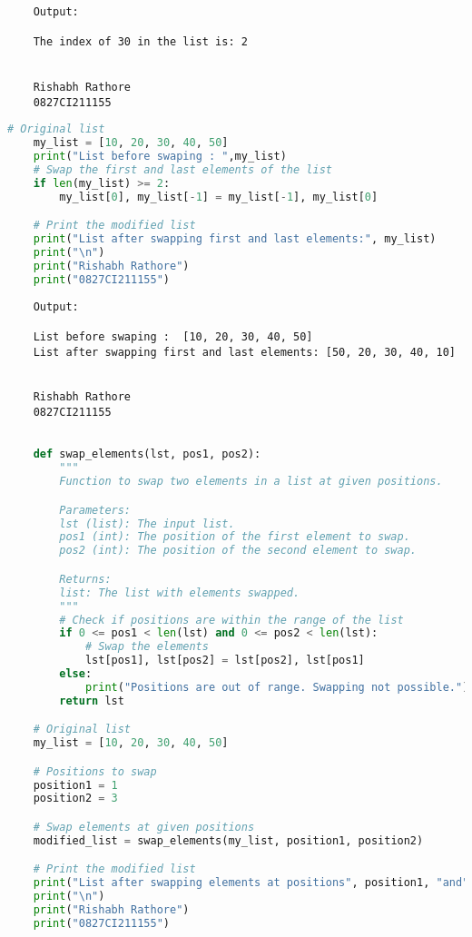 \documentclass{report}
\begin{document}
\begin{verbatim}

	Output:

	The index of 30 in the list is: 2


	Rishabh Rathore
	0827CI211155
\end{verbatim}
\bigskip


\sol{}
\begin{lstlisting}[language=Python]
	# Original list
	my_list = [10, 20, 30, 40, 50]
	print("List before swaping : ",my_list)
	# Swap the first and last elements of the list
	if len(my_list) >= 2:
		my_list[0], my_list[-1] = my_list[-1], my_list[0]

	# Print the modified list
	print("List after swapping first and last elements:", my_list)
	print("\n")
	print("Rishabh Rathore")
	print("0827CI211155")
\end{lstlisting}

\begin{verbatim}
	Output:

	List before swaping :  [10, 20, 30, 40, 50]
	List after swapping first and last elements: [50, 20, 30, 40, 10]
	
	
	Rishabh Rathore
	0827CI211155
\end{verbatim}
\bigskip


\sol{}
\begin{lstlisting}[language=Python]

	def swap_elements(lst, pos1, pos2):
		"""
		Function to swap two elements in a list at given positions.

		Parameters:
		lst (list): The input list.
		pos1 (int): The position of the first element to swap.
		pos2 (int): The position of the second element to swap.

		Returns:
		list: The list with elements swapped.
		"""
		# Check if positions are within the range of the list
		if 0 <= pos1 < len(lst) and 0 <= pos2 < len(lst):
			# Swap the elements
			lst[pos1], lst[pos2] = lst[pos2], lst[pos1]
		else:
			print("Positions are out of range. Swapping not possible.")
		return lst

	# Original list
	my_list = [10, 20, 30, 40, 50]

	# Positions to swap
	position1 = 1
	position2 = 3

	# Swap elements at given positions
	modified_list = swap_elements(my_list, position1, position2)

	# Print the modified list
	print("List after swapping elements at positions", position1, "and", position2, ":", modified_list)
	print("\n")
	print("Rishabh Rathore")
	print("0827CI211155")
\end{lstlisting}
\end{document}
